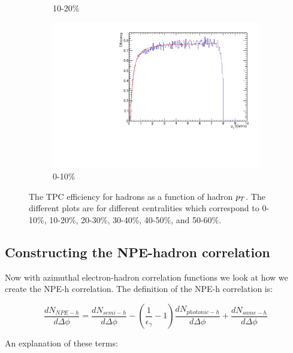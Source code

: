 \begin{figure}[htbp]
\begin{subfigure}{0.5\textwidth}
		\caption{10-20\%}
		\label{fig:assoheffe}
	\end{subfigure}	
	\begin{subfigure}{0.5\textwidth}
		\includegraphics[width=.9\textwidth]{Plots/Correlations/hadron_efficiency/hadron_efficiency_centbin_7.pdf}
		\caption{0-10\%}
		\label{fig:assohefff}
	\end{subfigure}	
\caption[Associated hadron efficiency]{The TPC efficiency for hadrons as a function of hadron $p_{T}$. The different plots are for different centralities which correspond to 0-10\%, 10-20\%, 20-30\%, 30-40\%, 40-50\%, and 50-60\%.}
\label{fig:assoheff}
\end{figure}

\subsection{Constructing the NPE-hadron correlation}

Now with azimuthal electron-hadron correlation functions we look at how we create the NPE-h correlation. The definition of the NPE-h correlation is:

\begin{equation}\label{eq:NPEhdef}
 \frac{dN_{NPE-h}}{d\Delta\phi} = \frac{dN_{semi-h}}{d\Delta\phi} - \left(\frac{1}{\epsilon_{\gamma}} - 1\right)\frac{dN_{photonic-h}}{d\Delta\phi} + \frac{dN_{same-h}}{d\Delta\phi}   
\end{equation} 

An explanation of these terms:

